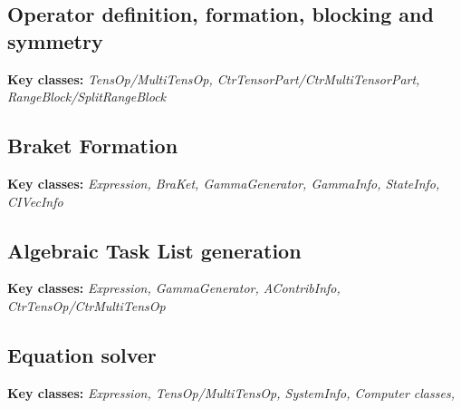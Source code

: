\documentclass[12pt]{article}
\begin{document}
\subsection{Operator definition, formation, blocking and symmetry } 
\textbf{Key classes:} \emph{TensOp/MultiTensOp, CtrTensorPart/CtrMultiTensorPart, RangeBlock/SplitRangeBlock}  

\subsection{Braket Formation} 
\textbf{Key classes:} \emph{Expression, BraKet, GammaGenerator, GammaInfo, StateInfo, CIVecInfo}  

\subsection{Algebraic Task List generation} 
\textbf{Key classes:} \emph{Expression, GammaGenerator, AContribInfo, CtrTensOp/CtrMultiTensOp}  

\subsection{Equation solver} 
\textbf{Key classes:} \emph{Expression, TensOp/MultiTensOp, SystemInfo, Computer classes, }  
\end{document}
